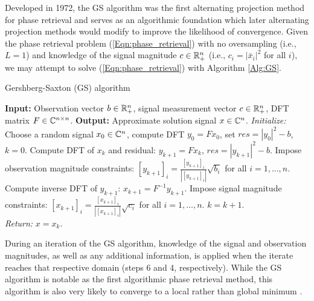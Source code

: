 Developed in 1972, the GS algorithm was the first alternating projection method for phase retrieval and serves as an algorithmic foundation which later alternating projection methods would modify to improve the likelihood of convergence.  
Given the phase retrieval problem (\ref{Eqn:phase_retrieval}) with no oversampling (i.e., $L=1$) and knowledge of the signal magnitude $c \in {\mathbb R}^n_+$ (i.e., $c_i = |\bar{x}_i|^2$ for all $i$), we may attempt to solve (\ref{Eqn:phase_retrieval}) with Algorithm \ref{Alg:GS}.

\begin{algorithm}[H]
\caption{Gershberg-Saxton (GS) algorithm}	\label{Alg:GS}

\begin{algorithmic}[1]
	\Statex 	\textbf{Input:} Observation vector $b \in {\mathbb R}^n_+$, signal measurement vector $c \in {\mathbb R}^n_+$, DFT matrix $F \in {\mathbb C}^{n \times n}$.
	\Statex 	\textbf{Output:} Approximate solution signal $x \in {\mathbb C}^n$.
	\State 		\textit{Initialize:} Choose a random signal $x_0 \in {\mathbb C}^n$, compute DFT $y_0 = F x_0$, set $res=|y_0|^2 - b$, $k = 0$.
		\State 	Compute DFT of $x_k$ and residual: $y_{k+1} = F x_k$, $res = |y_{k+1}|^2 - b$.
		\State	Impose observation magnitude constraints: $[y_{k+1}]_i = \frac{[y_{k+1}]_i}{|[y_{k+1}]_i|} \sqrt{b_i}$ for all $i = 1, \ldots, n$.
		\State	Compute inverse DFT of $y_{k+1}$: $x_{k+1} = F^{-1} y_{k+1}$.
		\State	Impose signal magnitude constraints: $[x_{k+1}]_i = \frac{[x_{k+1}]_i}{|[x_{k+1}]_i|} \sqrt{c_i}$ for all $i = 1, \ldots, n$.
		\State	$k = k + 1$.
	\EndWhile	\\
	\textit{Return:} $x = x_k$.
\end{algorithmic}
\end{algorithm}

During an iteration of the GS algorithm, knowledge of the signal and observation magnitudes, as well as any additional information, is applied when the iterate reaches that respective domain (steps 6 and 4, respectively).  While the GS algorithm is notable as the first algorithmic phase retrieval method, this algorithm is also very likely to converge to a local rather than global minimum \cite{DBLP:journals/corr/JaganathanEH15a}.




